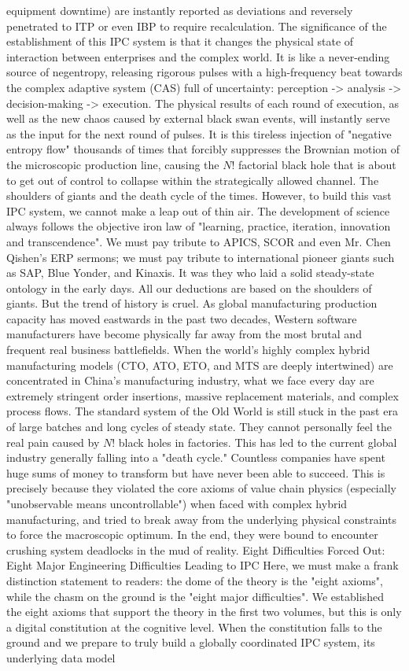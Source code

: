 \documentclass[11pt,a4paper]{article}
\begin{document}
equipment downtime) are instantly reported as deviations and reversely penetrated to ITP or even IBP to require recalculation. The significance of the establishment of this IPC system is that it changes the physical state of interaction between enterprises and the complex world. It is like a never-ending source of negentropy, releasing rigorous pulses with a high-frequency beat towards the complex adaptive system (CAS) full of uncertainty: perception -> analysis -> decision-making -> execution. The physical results of each round of execution, as well as the new chaos caused by external black swan events, will instantly serve as the input for the next round of pulses. It is this tireless injection of "negative entropy flow" thousands of times that forcibly suppresses the Brownian motion of the microscopic production line, causing the $N!$ factorial black hole that is about to get out of control to collapse within the strategically allowed channel. The shoulders of giants and the death cycle of the times. However, to build this vast IPC system, we cannot make a leap out of thin air. The development of science always follows the objective iron law of "learning, practice, iteration, innovation and transcendence". We must pay tribute to APICS, SCOR and even Mr. Chen Qishen’s ERP sermons; we must pay tribute to international pioneer giants such as SAP, Blue Yonder, and Kinaxis. It was they who laid a solid steady-state ontology in the early days. All our deductions are based on the shoulders of giants. But the trend of history is cruel. As global manufacturing production capacity has moved eastwards in the past two decades, Western software manufacturers have become physically far away from the most brutal and frequent real business battlefields. When the world's highly complex hybrid manufacturing models (CTO, ATO, ETO, and MTS are deeply intertwined) are concentrated in China's manufacturing industry, what we face every day are extremely stringent order insertions, massive replacement materials, and complex process flows. The standard system of the Old World is still stuck in the past era of large batches and long cycles of steady state. They cannot personally feel the real pain caused by $N!$ black holes in factories. This has led to the current global industry generally falling into a "death cycle." Countless companies have spent huge sums of money to transform but have never been able to succeed. This is precisely because they violated the core axioms of value chain physics (especially "unobservable means uncontrollable") when faced with complex hybrid manufacturing, and tried to break away from the underlying physical constraints to force the macroscopic optimum. In the end, they were bound to encounter crushing system deadlocks in the mud of reality. Eight Difficulties Forced Out: Eight Major Engineering Difficulties Leading to IPC Here, we must make a frank distinction statement to readers: the dome of the theory is the "eight axioms", while the chasm on the ground is the "eight major difficulties". We established the eight axioms that support the theory in the first two volumes, but this is only a digital constitution at the cognitive level. When the constitution falls to the ground and we prepare to truly build a globally coordinated IPC system, its underlying data model 
\end{document}
